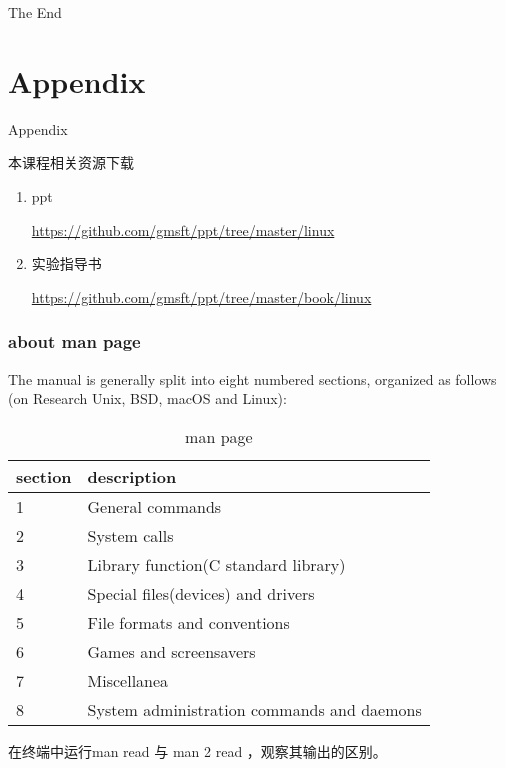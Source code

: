 \documentclass{beamer}
\begin{document}
\begin{frame}
\Huge{\centerline{The End}}
\end{frame}



\section{Appendix}
\begin{frame}
\Huge{\centerline{Appendix}}
\end{frame}
\begin{frame}{本课程相关资源下载}
\begin{enumerate}
\item
ppt

\url{https://github.com/gmsft/ppt/tree/master/linux}
\item
实验指导书

\url{https://github.com/gmsft/ppt/tree/master/book/linux}
\end{enumerate}
\end{frame}
\begin{frame}
\frametitle{about man page}
The manual is generally split into eight numbered sections, organized as follows (on Research Unix, BSD, macOS and Linux):
\begin{table}
\begin{tabular}{ll}
\toprule
\textbf{section} & \textbf{description} \\
\midrule
1 & General commands\\
2 & System calls\\
3 & Library function(C standard library)\\
4 & Special files(devices) and drivers\\
5 & File formats and conventions\\
6 & Games and screensavers\\
7 & Miscellanea\\
8 & System administration commands and daemons\\  
\bottomrule
\end{tabular}
\caption{man page}
\end{table}

在终端中运行man read 与 man 2 read ，观察其输出的区别。
\end{frame}
\end{document}
